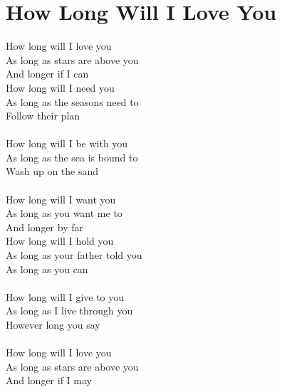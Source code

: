 \section{How Long Will I Love You}
How long will I love you\\
As long as stars are above you\\
And longer if I can\\
How long will I need you\\
As long as the seasons need to\\
Follow their plan\\
\\
How long will I be with you\\
As long as the sea is bound to\\
Wash up on the sand\\
\\
How long will I want you\\
As long as you want me to\\
And longer by far\\
How long will I hold you\\
As long as your father told you\\
As long as you can\\
\\
How long will I give to you\\
As long as I live through you\\
However long you say\\
\\
How long will I love you\\
As long as stars are above you\\
And longer if I may\\